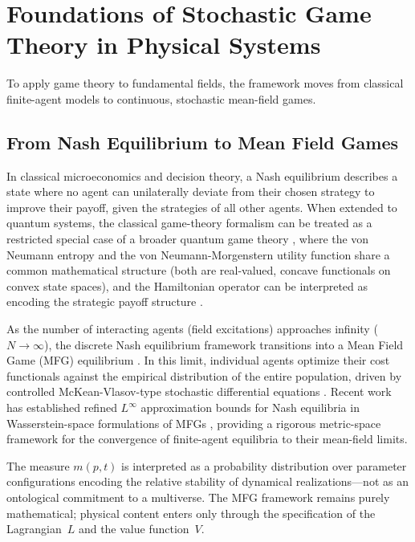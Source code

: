 \documentclass[12pt,a4paper]{article}
\theoremstyle{remark}
\begin{document}
\section{Foundations of Stochastic Game Theory in Physical Systems}
\label{sec:foundations}

To apply game theory to fundamental fields, the framework moves from classical finite-agent models to continuous, stochastic mean-field games.

\subsection{From Nash Equilibrium to Mean Field Games}

In classical microeconomics and decision theory, a Nash equilibrium \citep{Nash1950} describes a state where no agent can unilaterally deviate from their chosen strategy to improve their payoff, given the strategies of all other agents. When extended to quantum systems, the classical game-theory formalism can be treated as a restricted special case of a broader quantum game theory \citep{QuantumOptimization}, where the von Neumann entropy and the von Neumann-Morgenstern utility function share a common mathematical structure (both are real-valued, concave functionals on convex state spaces), and the Hamiltonian operator can be interpreted as encoding the strategic payoff structure \citep{Abel2023,QuantumOptimization}.

As the number of interacting agents (field excitations) approaches infinity ($N \to \infty$), the discrete Nash equilibrium framework transitions into a Mean Field Game (MFG) equilibrium \citep{LasryLions2007}. In this limit, individual agents optimize their cost functionals against the empirical distribution of the entire population, driven by controlled McKean-Vlasov-type stochastic differential equations \citep{LasryLions2006}. Recent work has established refined $L^\infty$ approximation bounds for Nash equilibria in Wasserstein-space formulations of MFGs \cite{DjeteTouzi2026}, providing a rigorous metric-space framework for the convergence of finite-agent equilibria to their mean-field limits.

The measure $m(p,t)$ is interpreted as a probability distribution over parameter configurations encoding the relative stability of dynamical realizations---not as an ontological commitment to a multiverse. The MFG framework remains purely mathematical; physical content enters only through the specification of the Lagrangian~$L$ and the value function~$V$.
\end{document}

